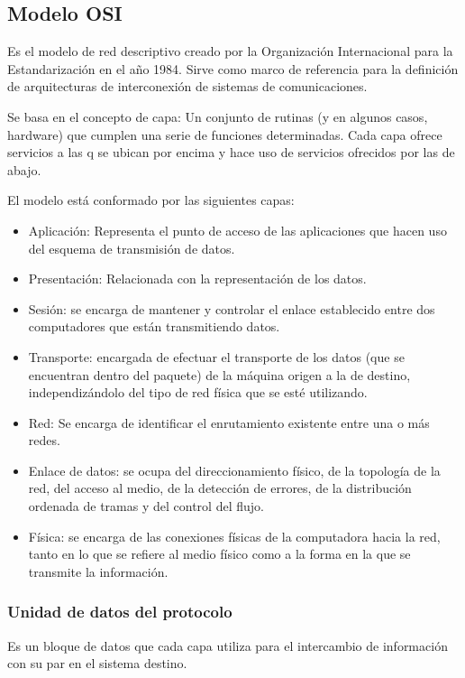 \subsection{Modelo OSI}

Es el modelo de red descriptivo creado por la Organización Internacional para la Estandarización en el año 1984. Sirve como marco de referencia para la definición de arquitecturas de interconexión de sistemas de comunicaciones.

Se basa en el concepto de capa: Un conjunto de rutinas (y en algunos casos, hardware) que cumplen una serie de funciones determinadas. Cada capa ofrece servicios a las q se ubican por encima y hace uso de servicios ofrecidos por las de abajo.

El modelo está conformado por las siguientes capas:

\begin{itemize}
	\item Aplicación: Representa el punto de acceso de las aplicaciones que hacen uso del esquema de transmisión de datos.
	\item Presentación: Relacionada con la representación de los datos.
	\item Sesión: se encarga de mantener y controlar el enlace establecido entre dos computadores que están transmitiendo datos.
	\item Transporte: encargada de efectuar el transporte de los datos (que se encuentran dentro del paquete) de la máquina origen a la de destino, independizándolo del tipo de red física que se esté utilizando.
	\item Red: Se encarga de identificar el enrutamiento existente entre una o más redes.
	\item Enlace de datos: se ocupa del direccionamiento físico, de la topología de la red, del acceso al medio, de la detección de errores, de la distribución ordenada de tramas y del control del flujo.
	\item Física: se encarga de las conexiones físicas de la computadora hacia la red, tanto en lo que se refiere al medio físico como a la forma en la que se transmite la información.
\end{itemize}

\subsubsection{Unidad de datos del protocolo}

Es un bloque de datos que cada capa utiliza para el intercambio de información con su par en el sistema destino. 

